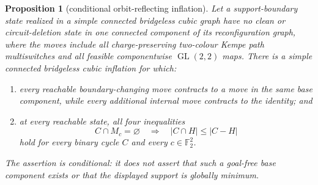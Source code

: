 \documentclass[11pt]{article}
\newtheorem{proposition}[theorem]{Proposition}
\theoremstyle{definition}
\theoremstyle{remark}
\newcommand{\F}{\mathbb F}
\begin{document}
\begin{proposition}[conditional orbit-reflecting inflation]
\label{prop:dynamicinflation}
Let a support-boundary state realized in a simple connected bridgeless
cubic graph have no clean or circuit-deletion state in one connected
component of its reconfiguration graph, where the moves include all
charge-preserving two-colour Kempe path multiswitches and all feasible
componentwise \(\operatorname{GL}(2,2)\) maps.  There is a simple
connected bridgeless cubic inflation for which:
\begin{enumerate}
  \item every reachable boundary-changing move contracts to a move in the
        same base component, while every additional internal move
        contracts to the identity; and
  \item at every reachable state, all four inequalities
        \[
        C\cap M_c=\varnothing\quad\Longrightarrow\quad
        |C\cap H|\leq |C-H|                                  \tag{30}
        \]
        hold for every binary cycle \(C\) and every \(c\in\F_2^2\).
\end{enumerate}
The assertion is conditional: it does not assert that such a goal-free
base component exists or that the displayed support is globally minimum.
\end{proposition}
\end{document}
